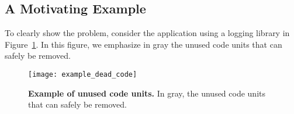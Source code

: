 %
%

\subsection{A Motivating Example} \label{sec:example_intro}

To clearly show the problem, consider the application using a logging library in Figure~\ref{fig:example_dead_code}. In this figure, we emphasize in gray the unused code units that can safely be removed.

\begin{figure}[ht]
\begin{center}
\texttt{[image: example\_dead\_code]}
\caption{\small\textbf{Example of unused code units.} In gray, the unused code units that can safely be removed.\label{fig:example_dead_code}}
\end{center}
\end{figure}

